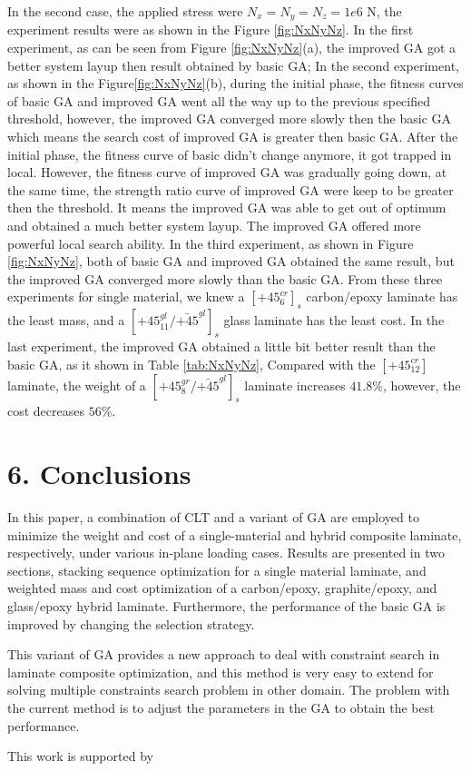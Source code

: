 \documentclass[Afour,sagev,times]{sagej}
\begin{document}
In the second case, the applied stress were $N_x=N_y=N_z=1e6$ N, the experiment results were as
shown in the Figure \ref{fig:NxNyNz}. In the first experiment, as can be seen from Figure \ref{fig:NxNyNz}(a), the improved GA got a
better system layup then result obtained by basic GA; In the second experiment, as shown in the Figure\ref{fig:NxNyNz}(b), during
the initial phase, the fitness curves of basic GA and improved GA went all the way up to the
previous specified threshold, however, the improved GA converged more slowly then the basic GA which
means the search cost of improved GA is greater then basic GA. After the initial phase, the fitness
curve of basic didn't change anymore, it got trapped in local.  However, the fitness curve of
improved GA was gradually going down, at the same time,  the strength ratio curve of improved GA
were keep to be greater then the threshold. It means the improved GA was able to get out of optimum
and obtained a much better system layup.  The improved GA offered more powerful local search
ability. In the third experiment, as shown in Figure \ref{fig:NxNyNz}, both of basic GA and improved
GA obtained the same result, but the improved GA converged more slowly than the basic GA. From these
three experiments for single material, we knew a $[\text{+}45_{6}^{cr}]_s$ carbon/epoxy laminate has
the least mass, and a $[\text{+}45_{11}^{gl}/\bar{\text{+}45}^{gl}]_s$ glass laminate has the least
cost. In the last experiment, the improved GA obtained a little bit better result than the basic GA,
as it shown in Table \ref{tab:NxNyNz}, Compared with the $[\text{+}45_{12}^{cr}]$ laminate, the
weight of a $[\text{+}45_8^{gr}/\bar{\text{+}45}^{gl}]_s$ laminate increases $41.8\%$, however, the
cost decreases $56\%$.

\section{6. Conclusions}
In this paper, a combination of CLT and a variant of GA are employed to minimize the weight and cost
of a single-material and hybrid composite laminate, respectively, under various in-plane loading
cases.  Results are presented in two sections, stacking sequence optimization for a single material
laminate, and weighted  mass and cost optimization of a carbon/epoxy, graphite/epoxy, and
glass/epoxy hybrid laminate.  Furthermore, the performance of the basic GA is improved by changing the
selection strategy.

This variant of GA provides a new approach to deal with constraint search in laminate composite
optimization, and this method is very easy to extend for solving multiple constraints search problem in other
domain. The problem with the current method is to adjust the parameters in the GA to obtain the best
performance. 



\begin{acks}
	This work is supported by
\end{acks}



\end{document}
